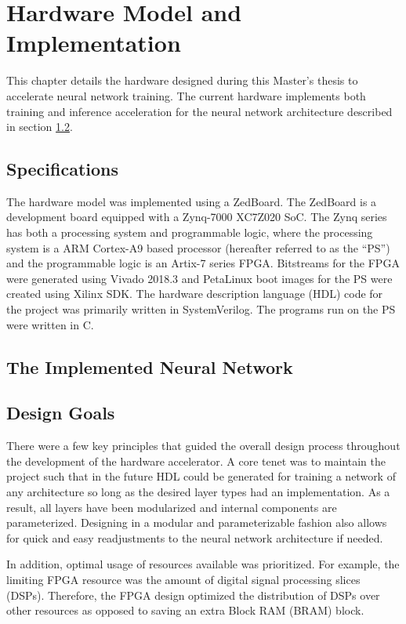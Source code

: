 \chapter{Hardware Model and Implementation}

This chapter details the hardware designed during this Master's thesis to accelerate neural network training. The current hardware implements both training and inference acceleration for the neural network architecture described in section \ref{net-arch}.
\section{Specifications}
The hardware model was implemented using a ZedBoard. The ZedBoard is a development board equipped with a Zynq-7000 XC7Z020 SoC. The Zynq series has both a processing system and programmable logic, where the processing system is a ARM Cortex-A9 based processor (hereafter referred to as the ``PS'') and the programmable logic is an Artix-7 series FPGA. Bitstreams for the FPGA were generated using Vivado 2018.3 and PetaLinux boot images for the PS were created using Xilinx SDK. The hardware description language (HDL) code for the project was primarily written in SystemVerilog. The programs run on the PS were written in C.

\section{The Implemented Neural Network}\label{net-arch}

\section{Design Goals}
There were a few key principles that guided the overall design process throughout the development of the hardware accelerator. A core tenet was to maintain the project such that in the future HDL could be generated for training a network of any architecture so long as the desired layer types had an implementation. As a result, all layers have been modularized and internal components are parameterized. Designing in a modular and parameterizable fashion also allows for quick and easy readjustments to the neural network architecture if needed.
\par 
In addition, optimal usage of resources available was prioritized. For example, the limiting FPGA resource was the amount of digital signal processing slices (DSPs). Therefore, the FPGA design optimized the distribution of DSPs over other resources as opposed to saving an extra Block RAM (BRAM) block. 

